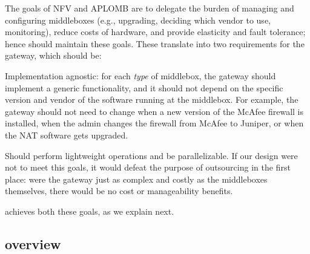 The goals of NFV and APLOMB are to delegate the burden of managing and configuring
middleboxes (e.g., upgrading, deciding which vendor to use, monitoring), reduce costs of hardware,
and provide elasticity and fault tolerance; hence \sys should maintain these goals.
%
These translate into two  requirements for the gateway, which should be: 
\begin{CompactItemize}
\item Implementation agnostic: for each {\em type} of middlebox, the gateway should implement a generic functionality, and it should not depend on the specific version and vendor of the software running at the middlebox. For example, the gateway should not need to change when a new version of the McAfee firewall is installed, when the admin changes the firewall  from McAfee to Juniper, or when the NAT software gets upgraded. 
\item Should perform lightweight operations and be parallelizable.  If our design were not to meet this goals, it would defeat the purpose of outsourcing in the first place: were the gateway just as complex and costly as the middleboxes themselves, there would be no cost or manageability benefits.

\end{CompactItemize}


\sys achieves both these goals, as we explain next.


\subsection{\sys overview}


